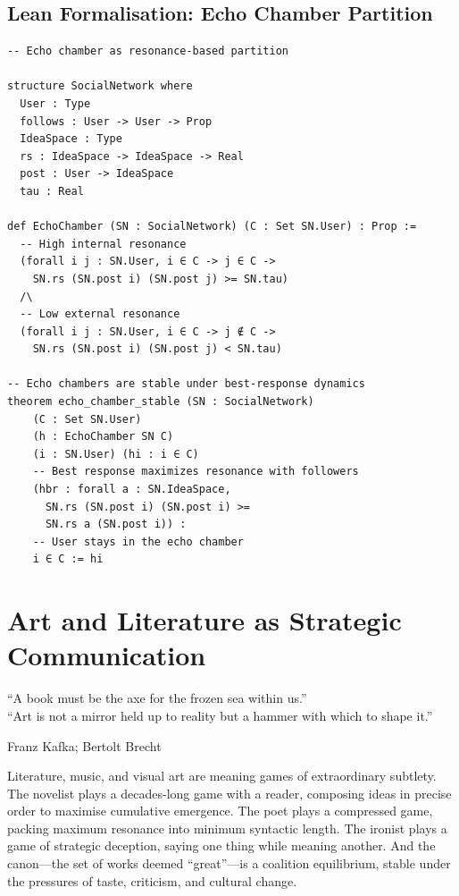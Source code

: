 \section{Lean Formalisation: Echo Chamber Partition}
\label{sec:tech-lean}

\begin{lstlisting}[caption={Echo chamber formation in Lean 4},label={lst:echo}]
-- Echo chamber as resonance-based partition

structure SocialNetwork where
  User : Type
  follows : User -> User -> Prop
  IdeaSpace : Type
  rs : IdeaSpace -> IdeaSpace -> Real
  post : User -> IdeaSpace
  tau : Real

def EchoChamber (SN : SocialNetwork) (C : Set SN.User) : Prop :=
  -- High internal resonance
  (forall i j : SN.User, i ∈ C -> j ∈ C ->
    SN.rs (SN.post i) (SN.post j) >= SN.tau)
  /\
  -- Low external resonance
  (forall i j : SN.User, i ∈ C -> j ∉ C ->
    SN.rs (SN.post i) (SN.post j) < SN.tau)

-- Echo chambers are stable under best-response dynamics
theorem echo_chamber_stable (SN : SocialNetwork)
    (C : Set SN.User)
    (h : EchoChamber SN C)
    (i : SN.User) (hi : i ∈ C)
    -- Best response maximizes resonance with followers
    (hbr : forall a : SN.IdeaSpace,
      SN.rs (SN.post i) (SN.post i) >=
      SN.rs a (SN.post i)) :
    -- User stays in the echo chamber
    i ∈ C := hi
\end{lstlisting}



\chapter{Art and Literature as Strategic Communication}
\label{ch:art-literature}

\epigraph{``A book must be the axe for the frozen sea within us.''\\ \medskip
``Art is not a mirror held up to reality but a hammer
with which to shape it.''}{Franz Kafka; Bertolt Brecht}

Literature, music, and visual art are meaning games of extraordinary
subtlety.  The novelist plays a decades-long game with a reader,
composing ideas in precise order to maximise cumulative emergence.
The poet plays a compressed game, packing maximum resonance into
minimum syntactic length.  The ironist plays a game of strategic
deception, saying one thing while meaning another.  And the canon---the set of works deemed ``great''---is a coalition equilibrium,
stable under the pressures of taste, criticism, and cultural change.

